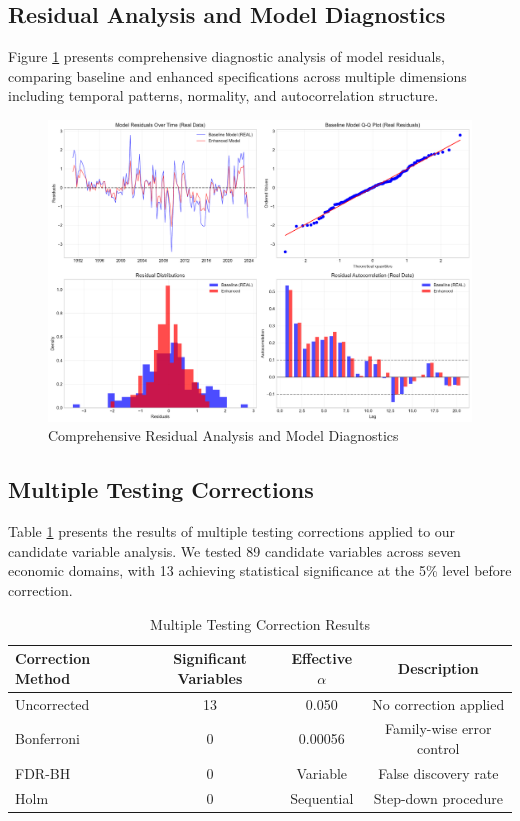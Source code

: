 \documentclass[12pt]{article}
\begin{document}
\subsection{Residual Analysis and Model Diagnostics}

Figure \ref{fig:residual_analysis} presents comprehensive diagnostic analysis of model residuals, comparing baseline and enhanced specifications across multiple dimensions including temporal patterns, normality, and autocorrelation structure.

\begin{figure}[H]
\centering
\includegraphics[width=\textwidth]{../figures/residual_analysis.pdf}
\caption{Comprehensive Residual Analysis and Model Diagnostics}
\label{fig:residual_analysis}
\end{figure}

\subsection{Multiple Testing Corrections}

Table \ref{tab:multiple} presents the results of multiple testing corrections applied to our candidate variable analysis. We tested 89 candidate variables across seven economic domains, with 13 achieving statistical significance at the 5\% level before correction.

\begin{table}[H]
\centering
\caption{Multiple Testing Correction Results}
\label{tab:multiple}
\begin{tabular}{lccc}
\toprule
Correction Method & Significant Variables & Effective $\alpha$ & Description \\
\midrule
Uncorrected & 13 & 0.050 & No correction applied \\
Bonferroni & 0 & 0.00056 & Family-wise error control \\
FDR-BH & 0 & Variable & False discovery rate \\
Holm & 0 & Sequential & Step-down procedure \\
\bottomrule
\end{tabular}
\end{table}
\end{document}
